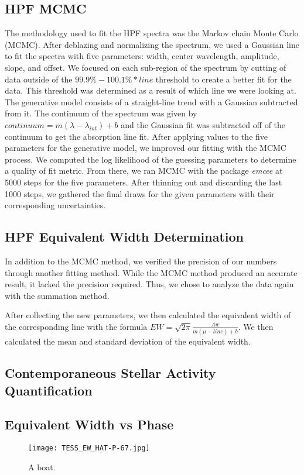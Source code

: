 \documentclass{aastex631}
\begin{document}
\subsection{HPF MCMC}
The methodology used to fit the HPF spectra was the Markov chain Monte Carlo (MCMC). After deblazing and normalizing the spectrum, we used a Gaussian line to fit the spectra with five parameters: width, center wavelength, amplitude, slope, and offset.  We focused on each sub-region of the spectrum by cutting of data outside of the $99.9\%-100.1\%*line$ threshold to create a better fit for the data. This threshold was determined as a result of which line we were looking at. The generative model consists of a straight-line trend with a Gaussian subtracted from it. The continuum of the spectrum was given by $continuum=m(\lambda-\lambda_{int})+b$ and the Gaussian fit was subtracted off of the continuum to get the absorption line fit. After applying values to the five parameters for the generative model, we improved our fitting with the MCMC process. We computed the log likelihood of the guessing parameters to determine a quality of fit metric. From there, we ran MCMC with the package \textit{emcee} at 5000 steps for the five parameters. After thinning out and discarding the last 1000 steps, we gathered the final draws for the given parameters with their corresponding uncertainties.

\subsection{HPF Equivalent Width Determination}
In addition to the MCMC method, we verified the precision of our numbers through another fitting method. While the MCMC method produced an accurate result, it lacked the precision required. Thus, we chose to analyze the data again with the summation method.

After collecting the new parameters, we then calculated the equivalent width of the corresponding line with the formula $EW=\sqrt{2\pi}\frac{Aw}{m(\mu-line)+b}$. We then calculated the mean and standard deviation of the equivalent width.
\subsection{Contemporaneous Stellar Activity Quantification}
\subsection{Equivalent Width vs Phase}
\begin{figure}
    \texttt{[image: TESS\_EW\_HAT-P-67.jpg]}
    \caption{A boat.}
    \label{fig:boat1}
\end{figure}
\end{document}
